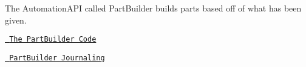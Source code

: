 The Automation\+API called Part\+Builder builds parts based off of what has been given.

\href{https://github.com/chloebeth/software-architecture-automation-api/blob/main/AutomationBinding/PartBuilder.cpp}{\texttt{ The Part\+Builder Code}}

\href{https://github.com/chloebeth/software-architecture-automation-api/blob/main/Journaling/Journaling_PartBuilder.cpp}{\texttt{ Part\+Builder Journaling}} 